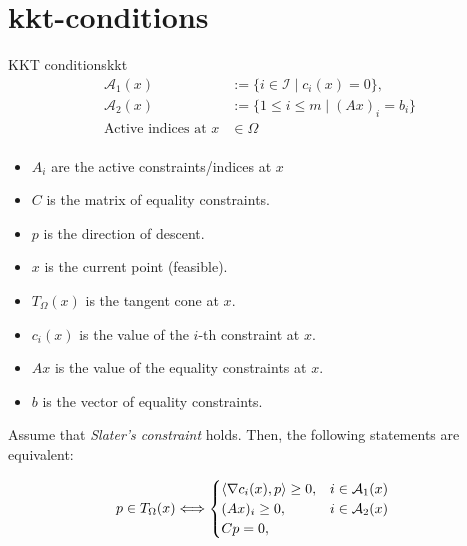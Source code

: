 \section[KKT-betingelser]{\gls{kkt-conditions}}

\begin{theorem}{KKT conditions}{kkt}
	\begin{align*}
		\mathcal{A}_1(x)            & := \{i \in \mathcal{I} \mid c_i(x) = 0\},                     \\
		\mathcal{A}_2(x)            & := \{1 \leq i \leq m \mid (Ax)_i = b_i\} \tag{Active indices} \\
		\text{Active indices at } x & \in \Omega                                                    \\
	\end{align*}

	\begin{itemize}
		\item \(A_i\) are the active constraints/indices at \(x\)
		\item \(C\) is the matrix of equality constraints.
		\item \(p\) is the direction of descent.
		\item \(x\) is the current point (feasible).
		\item \(T_{\Omega}(x)\) is the tangent cone at \(x\).
		\item \(c_i(x)\) is the value of the \(i\)-th constraint at \(x\).
		\item \(Ax\) is the value of the equality constraints at \(x\).
		\item \(b\) is the vector of equality constraints.
	\end{itemize}

	Assume that \emph{Slater's constraint} holds. Then, the following statements are equivalent:

	\begin{align*}
		p\in T_{\Omega}(x) & \Longleftrightarrow
		\begin{cases}
			\langle\nabla c_i(x), p\rangle \geq 0, & i \in \mathcal{A}_1(x) \\
			(Ax)_i \geq 0,                   & i \in \mathcal{A}_2(x) \\
			Cp = 0,                          &                        \\
		\end{cases}
	\end{align*}
\end{theorem}

